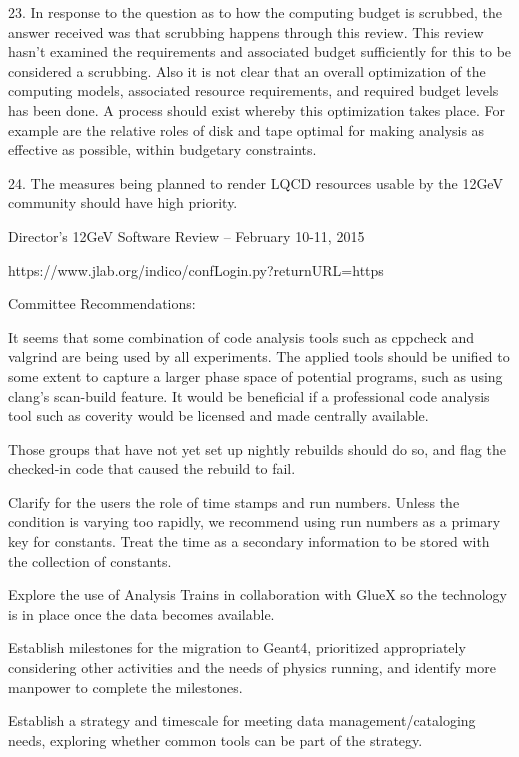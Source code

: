 \documentclass[12pt]{article}
\begin{document}
23. In response to the question as to how the computing budget is scrubbed, the answer received was that scrubbing happens through this review. This review hasn’t examined the requirements and associated budget sufficiently for this to be considered a scrubbing. Also it is not clear that an overall optimization of the computing models, associated resource requirements, and required budget levels has been done. A process should exist whereby this optimization takes place. For example are the relative roles of disk and tape optimal for making analysis as effective as possible, within budgetary constraints.

24. The measures being planned to render LQCD resources usable by the 12GeV community should have high priority. 

Director’s 12GeV Software Review – February 10-11, 2015

https://www.jlab.org/indico/confLogin.py?returnURL=https%

Committee Recommendations:

It seems that some combination of code analysis tools such as cppcheck and valgrind are being used by all experiments. The applied tools should be unified to some extent to capture a larger phase space of potential programs, such as using clang’s scan-build feature. It would be beneficial if a professional code analysis tool such as coverity would be licensed and made centrally available.

Those groups that have not yet set up nightly rebuilds should do so, and flag the checked-in code that caused the rebuild to fail.

Clarify for the users the role of time stamps and run numbers. Unless the condition is varying too rapidly, we recommend using run numbers as a primary key for constants. Treat the time as a secondary information to be stored with the collection of constants.

Explore the use of Analysis Trains in collaboration with GlueX so the technology is in place once the data becomes available.

Establish milestones for the migration to Geant4, prioritized appropriately considering other activities and the needs of physics running, and identify more manpower to complete the milestones.

Establish a strategy and timescale for meeting data management/cataloging needs, exploring whether common tools can be part of the strategy.
\end{document}
